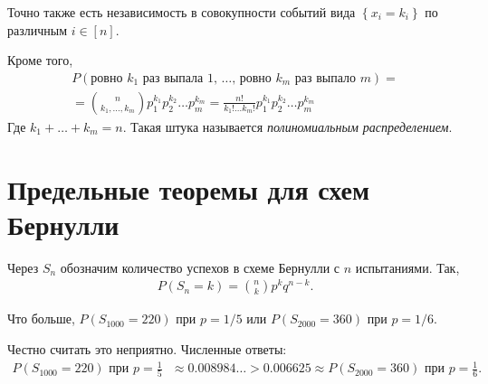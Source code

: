 \begin{prop*}
 Точно также есть независимость в совокупности событий вида $\left\{ x_i = k_i \right\}$  по различным $i \in [n]$. 
\end{prop*}

\begin{prop*}
 Кроме того,
 \begin{align*}
  P(\text{ровно $k_1$ раз выпала $1$, \ldots, ровно $k_m$ раз выпало $m$}) = \\
  = \binom n {k_1,\ldots,k_m} p_1^{k_1} p_2^{k_2} \ldots p_m^{k_m} = \frac{n!}{k_1! \ldots k_m!} p_1^{k_1} p_2^{k_2} \ldots p_m^{k_m}
 \end{align*} Где $k_1 + \dots + k_m = n$. Такая штука называется \textit{полиномиальным распределением}.
\end{prop*}


\section{Предельные теоремы для схем Бернулли}

\begin{notatn*}
 Через $S_n$ обозначим количество успехов в схеме Бернулли с $n$ испытаниями. Так,
 \begin{align*}
  P(S_n = k) = \binom n k p^{k} q^{n-k}.
 \end{align*} 
\end{notatn*}

\begin{exmpl*}
 Что больше, $P(S_{1000} = 220)$ при $p = 1 / 5$ или $P(S_{2000} = 360)$ при $p = 1 / 6$.

 Честно считать это неприятно. Численные ответы:
 \begin{align*}
  P(S_{1000} = 220) \text{ при $p = \frac{1}{5}$ } \approx 0.008984\ldots > 0.006625 \approx P(S_{2000} = 360) \text{ при $p = \frac{1}{6}$}
 .\end{align*}
\end{exmpl*}

